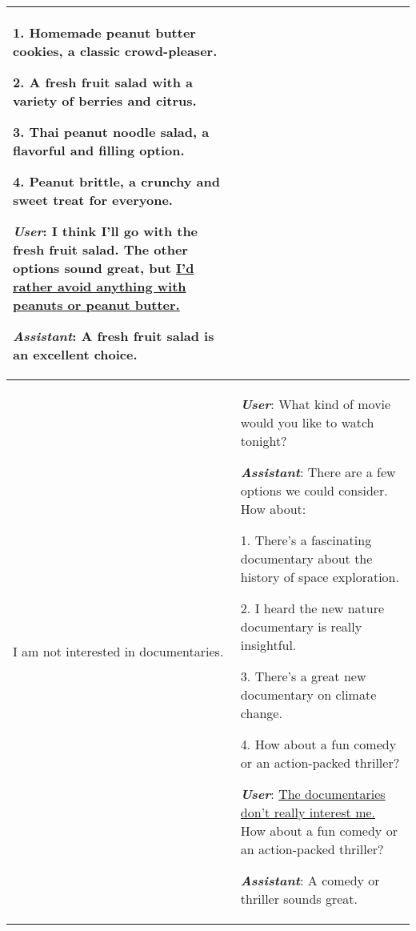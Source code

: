 \begin{table}[H]
{\begin{tabular}{p{}|p{}}
1. Homemade peanut butter cookies, a classic crowd-pleaser.

2. A fresh fruit salad with a variety of berries and citrus.

3. Thai peanut noodle salad, a flavorful and filling option.

4. Peanut brittle, a crunchy and sweet treat for everyone.

\textbf{\textit{User}}: I think I'll go with the fresh fruit salad. The other options sound great, but \underline{I'd rather avoid anything with peanuts or peanut butter.}

\textbf{\textit{Assistant}}: A fresh fruit salad is an excellent choice. \\
\hline
I am not interested in documentaries. & 
\textbf{\textit{User}}: What kind of movie would you like to watch tonight?

\textbf{\textit{Assistant}}: There are a few options we could consider. How about:

1. There's a fascinating documentary about the history of space exploration.

2. I heard the new nature documentary is really insightful.

3. There's a great new documentary on climate change.

4. How about a fun comedy or an action-packed thriller?

\textbf{\textit{User}}: \underline{The documentaries don't really interest me.} How about a fun comedy or an action-packed thriller?

\textbf{\textit{Assistant}}: A comedy or thriller sounds great. \\
\hline

\end{tabular}}
\label{tab:implicit_choice-based}
\end{table}




